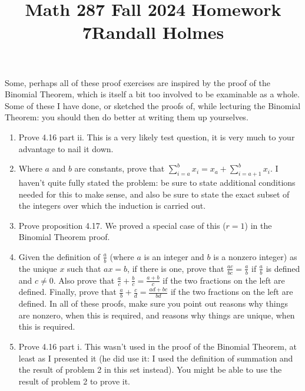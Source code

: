 \documentclass[12pt]{article}
\title{Math 287 Fall 2024 Homework 7}
\title{Randall Holmes}
\begin{document}
\maketitle

Some, perhaps all of these proof exercises are inspired by the proof of the Binomial Theorem, which is itself a bit too involved to be examinable as a whole.  Some of these I have done, or sketched the proofs of, while lecturing the Binomial Theorem:  you should then do better at writing them up yourselves.

\begin{enumerate}

\item  Prove 4.16 part ii.  This is a very likely test question, it is very much to your advantage to nail it down.

\item  Where $a$ and $b$ are constants, prove that $\sum_{i=a}^b x_i = x_a + \sum_{i=a+1}^b x_i$.  I haven't quite fully stated the problem:  be sure to state additional conditions needed for this to make sense, and also be sure to state the exact subset of the integers over which the induction is carried out.

\item  Prove proposition 4.17.  We proved a special case of this ($r=1$) in the Binomial Theorem proof.

\item  Given the definition of $\frac ab$ (where $a$ is an integer and $b$ is a nonzero integer) as the unique $x$ such 
that $ax=b$, if there is one, prove that $\frac{ac}{bc} = \frac ab$ if $\frac ab$ is defined and $c \neq 0$.  Also prove
that $\frac ac + \frac bc = \frac {a+b}c$ if the two fractions on the left are defined.  Finally, prove
that $\frac ab + \frac cd = \frac {ad+bc}{bd}$ if the two fractions on the left are defined.  In all of these proofs, make sure you point out reasons why things are nonzero, when this is required, and reasons why things are unique, when this is required.

\item   Prove 4.16 part i.  This wasn't used in the proof of the Binomial Theorem, at least as I presented it (he did use it:  I used the definition of summation and the result of problem 2 in this set instead).  You might be able to use the result of problem 2 to prove it.

\end{enumerate}
\end{document}
